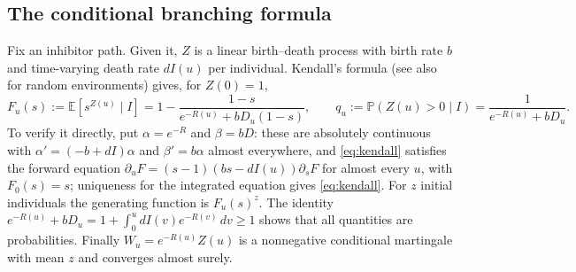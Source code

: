 \documentclass[11pt,a4paper]{article}
\numberwithin{equation}{section}
\theoremstyle{definition}\newtheorem{definition}[theorem]{Definition}
\theoremstyle{remark}\newtheorem{remark}[theorem]{Remark}\newtheorem{example}[theorem]{Example}
\newcommand{\E}{\mathbb E}
\renewcommand{\P}{\mathbb P}
\begin{document}
\subsection{The conditional branching formula}\label{sec:kendall}
Fix an inhibitor path. Given it, $Z$ is a linear birth--death process with birth rate $b$ and time-varying death rate $dI(u)$ per individual. Kendall's formula \cite{Kendall1948} (see also \cite{CogburnTorrez1981,BacaerEdDarraz2014} for random environments) gives, for $Z(0)=1$,
\begin{equation}\label{eq:kendall}
F_u(s):=\E[s^{Z(u)}\mid I]=1-\frac{1-s}{e^{-R(u)}+bD_u(1-s)},\qquad q_u:=\P(Z(u)>0\mid I)=\frac1{e^{-R(u)}+bD_u}.
\end{equation}
To verify it directly, put $\alpha=e^{-R}$ and $\beta=bD$: these are absolutely continuous with $\alpha'=(-b+dI)\alpha$ and $\beta'=b\alpha$ almost everywhere, and \eqref{eq:kendall} satisfies the forward equation $\partial_uF=(s-1)(bs-dI(u))\partial_sF$ for almost every $u$, with $F_0(s)=s$; uniqueness for the integrated equation gives \eqref{eq:kendall}. For $z$ initial individuals the generating function is $F_u(s)^z$. The identity $e^{-R(u)}+bD_u=1+\int_0^udI(v)e^{-R(v)}\,dv\ge1$ shows that all quantities are probabilities. Finally $W_u=e^{-R(u)}Z(u)$ is a nonnegative conditional martingale with mean $z$ and converges almost surely.
\end{document}
